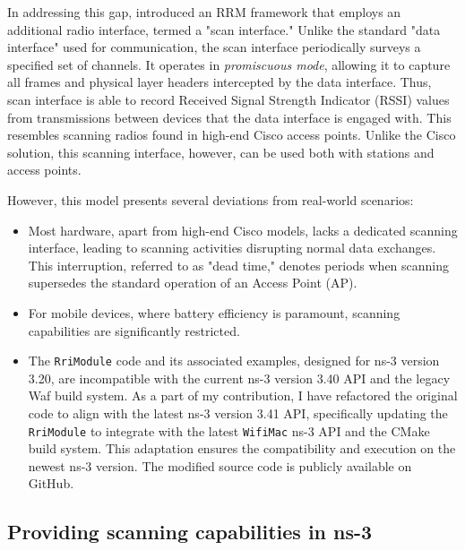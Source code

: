In addressing this gap, \cite{bharadwajSimulationFrameworkRadio2017} introduced an RRM framework that employs an additional radio interface, termed a "scan interface." Unlike the standard "data interface" used for communication, the scan interface periodically surveys a specified set of channels. It operates in \textit{promiscuous mode}, allowing it to capture all frames and physical layer headers intercepted by the data interface. Thus, scan interface is able to record Received Signal Strength Indicator (RSSI) values from transmissions between devices that the data interface is engaged with. This resembles scanning radios found in high-end Cisco access points. Unlike the Cisco solution, this scanning interface, however, can be used both with stations and access points.

However, this model presents several deviations from real-world scenarios:
\begin{itemize}
    \item Most hardware, apart from high-end Cisco models, lacks a dedicated scanning interface, leading to scanning activities disrupting normal data exchanges. This interruption, referred to as "dead time," denotes periods when scanning supersedes the standard operation of an Access Point (AP).
    \item For mobile devices, where battery efficiency is paramount, scanning capabilities are significantly restricted.
    \item The \texttt{RriModule} code and its associated examples, designed for ns-3 version 3.20, are incompatible with the current ns-3 version 3.40 API and the legacy Waf build system. As a part of my contribution, I have refactored the original code to align with the latest ns-3 version 3.41 API, specifically updating the \texttt{RriModule} to integrate with the latest \texttt{WifiMac} ns-3 API and the CMake build system. This adaptation ensures the compatibility and execution on the newest ns-3 version. The modified source code is publicly available on GitHub.
\end{itemize}

\subsection{Providing scanning capabilities in ns-3}
\label{chap:impl:sec:simulation_method:subsec:scanning}

